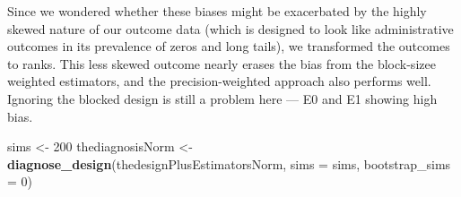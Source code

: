 \documentclass[
  12pt,
]{book}
\newenvironment{Shaded}{\begin{snugshade}}{\end{snugshade}}
\newcommand{\ControlFlowTok}[1]{\textcolor[rgb]{0.13,0.29,0.53}{\textbf{#1}}}
\newcommand{\DataTypeTok}[1]{\textcolor[rgb]{0.13,0.29,0.53}{#1}}
\newcommand{\DecValTok}[1]{\textcolor[rgb]{0.00,0.00,0.81}{#1}}
\newcommand{\KeywordTok}[1]{\textcolor[rgb]{0.13,0.29,0.53}{\textbf{#1}}}
\newcommand{\NormalTok}[1]{#1}
\newcommand{\OperatorTok}[1]{\textcolor[rgb]{0.81,0.36,0.00}{\textbf{#1}}}
\newcommand{\StringTok}[1]{\textcolor[rgb]{0.31,0.60,0.02}{#1}}
\theoremstyle{definition}
\theoremstyle{definition}
\theoremstyle{definition}
\theoremstyle{remark}
\begin{document}
Since we wondered whether these biases might be exacerbated by the
highly skewed nature of our outcome data (which is designed to look like
administrative outcomes in its prevalence of zeros and long tails), we
transformed the outcomes to ranks. This less skewed outcome nearly
erases the bias from the block-sizee weighted estimators, and the
precision-weighted approach also performs well. Ignoring the blocked
design is still a problem here --- E0 and E1 showing high bias.

\begin{Shaded}
\end{Shaded}

\begin{Shaded}
\begin{Highlighting}[]
\NormalTok{sims <-}\StringTok{ }\DecValTok{200}
\NormalTok{thediagnosisNorm <-}\StringTok{ }\KeywordTok{diagnose_design}\NormalTok{(thedesignPlusEstimatorsNorm, }\DataTypeTok{sims =}\NormalTok{ sims, }\DataTypeTok{bootstrap_sims =} \DecValTok{0}\NormalTok{)}
\end{Highlighting}
\end{Shaded}
\end{document}
